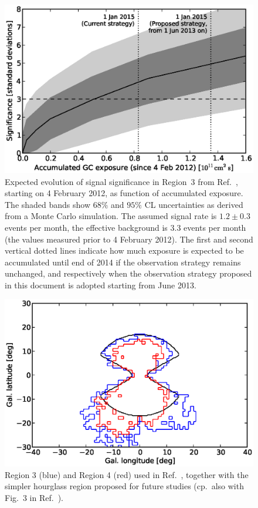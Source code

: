 \documentclass[aps,prd,superscriptaddress,nofootinbib,fixlfloat, 12pt]{revtex4-1}
\begin{document}
\begin{figure}[h]
  \begin{center}
    \includegraphics[width=0.6\linewidth]{plots/projection.eps}
    \vspace{-0.5cm}
  \end{center}
  \caption{
    Expected evolution of signal significance in Region~3 from
    Ref.~\cite{Weniger:2012}, starting on 4
    February 2012, as function of
    accumulated exposure.  The shaded bands show $68\%$ and $95\%$ CL
    uncertainties as derived from a Monte Carlo simulation.  The assumed
    signal rate is $1.2\pm 0.3$ events per month, the effective background is
    $3.3$ events per month (the values measured prior to 4 February 2012).
    The first and second vertical dotted lines indicate how much exposure is
    expected to be accumulated until end of 2014 if the observation strategy remains
    unchanged, and respectively when the observation strategy proposed in this
    document is adopted starting from June 2013.}
  \label{fig:projection}
\end{figure}

\begin{figure}[h]
  \begin{center}
    \includegraphics[width=0.6\linewidth]{plots/regions.eps}
    \vspace{-0.5cm}
  \end{center}
  \caption{Region 3 (blue) and Region 4 (red) used in
  Ref.~\cite{Weniger:2012}, together with the simpler hourglass region
  proposed for future studies (cp.~also with Fig.~3 in
  Ref.~\cite{Bringmann:2012ez}).}
  \label{fig:regions}
\end{figure}
\end{document}
